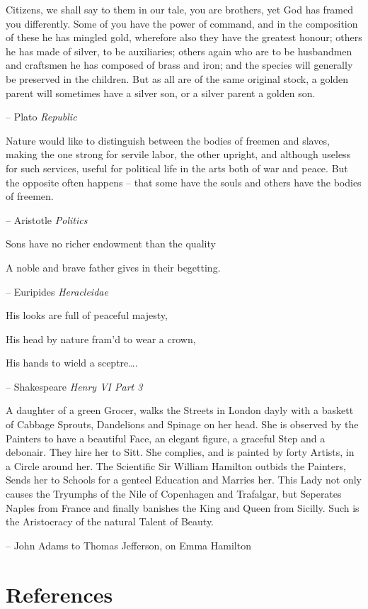 \documentclass[
]{article}
\begin{document}
Citizens, we shall say to them in our tale, you are brothers, yet God
has framed you differently. Some of you have the power of command, and
in the composition of these he has mingled gold, wherefore also they
have the greatest honour; others he has made of silver, to be
auxiliaries; others again who are to be husbandmen and craftsmen he has
composed of brass and iron; and the species will generally be preserved
in the children. But as all are of the same original stock, a golden
parent will sometimes have a silver son, or a silver parent a golden
son.

-- Plato \emph{Republic}

Nature would like to distinguish between the bodies of freemen and
slaves, making the one strong for servile labor, the other upright, and
although useless for such services, useful for political life in the
arts both of war and peace. But the opposite often happens -- that some
have the souls and others have the bodies of freemen.

-- Aristotle \emph{Politics}

Sons have no richer endowment than the quality

A noble and brave father gives in their begetting.

-- Euripides \emph{Heracleidae}

His looks are full of peaceful majesty,

His head by nature fram'd to wear a crown,

His hands to wield a sceptre\ldots.

-- Shakespeare \emph{Henry VI Part 3}

A daughter of a green Grocer, walks the Streets in London dayly with a
baskett of Cabbage Sprouts, Dandelions and Spinage on her head. She is
observed by the Painters to have a beautiful Face, an elegant figure, a
graceful Step and a debonair. They hire her to Sitt. She complies, and
is painted by forty Artists, in a Circle around her. The Scientific Sir
William Hamilton outbids the Painters, Sends her to Schools for a
genteel Education and Marries her. This Lady not only causes the
Tryumphs of the Nile of Copenhagen and Trafalgar, but Seperates Naples
from France and finally banishes the King and Queen from Sicilly. Such
is the Aristocracy of the natural Talent of Beauty.

-- John Adams to Thomas Jefferson, on Emma Hamilton

\newpage

\hypertarget{references}{%
\section*{References}\label{references}}
\end{document}
